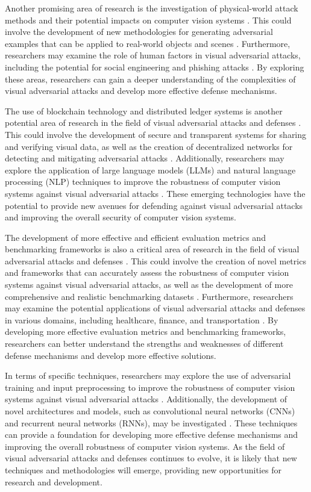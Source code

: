 \documentclass[11pt]{article}
\begin{document}
Another promising area of research is the investigation of physical-world attack methods and their potential impacts on computer vision systems \cite{ref138}. This could involve the development of new methodologies for generating adversarial examples that can be applied to real-world objects and scenes \cite{ref139}. Furthermore, researchers may examine the role of human factors in visual adversarial attacks, including the potential for social engineering and phishing attacks \cite{ref140}. By exploring these areas, researchers can gain a deeper understanding of the complexities of visual adversarial attacks and develop more effective defense mechanisms.

The use of blockchain technology and distributed ledger systems is another potential area of research in the field of visual adversarial attacks and defenses \cite{ref141}. This could involve the development of secure and transparent systems for sharing and verifying visual data, as well as the creation of decentralized networks for detecting and mitigating adversarial attacks \cite{ref142}. Additionally, researchers may explore the application of large language models (LLMs) and natural language processing (NLP) techniques to improve the robustness of computer vision systems against visual adversarial attacks \cite{ref143}. These emerging technologies have the potential to provide new avenues for defending against visual adversarial attacks and improving the overall security of computer vision systems.

The development of more effective and efficient evaluation metrics and benchmarking frameworks is also a critical area of research in the field of visual adversarial attacks and defenses \cite{ref144}. This could involve the creation of novel metrics and frameworks that can accurately assess the robustness of computer vision systems against visual adversarial attacks, as well as the development of more comprehensive and realistic benchmarking datasets \cite{ref145}. Furthermore, researchers may examine the potential applications of visual adversarial attacks and defenses in various domains, including healthcare, finance, and transportation \cite{ref146}. By developing more effective evaluation metrics and benchmarking frameworks, researchers can better understand the strengths and weaknesses of different defense mechanisms and develop more effective solutions.

In terms of specific techniques, researchers may explore the use of adversarial training and input preprocessing to improve the robustness of computer vision systems against visual adversarial attacks \cite{ref147}. Additionally, the development of novel architectures and models, such as convolutional neural networks (CNNs) and recurrent neural networks (RNNs), may be investigated \cite{ref148}. These techniques can provide a foundation for developing more effective defense mechanisms and improving the overall robustness of computer vision systems. As the field of visual adversarial attacks and defenses continues to evolve, it is likely that new techniques and methodologies will emerge, providing new opportunities for research and development.
\end{document}
